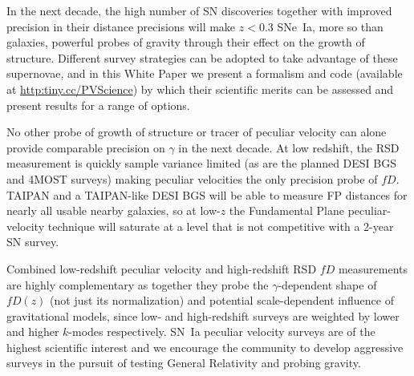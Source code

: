 \documentclass[11pt, oneside]{article}   	%
\begin{document}
In the next decade,
the high number of SN discoveries together with improved precision in their distance precisions will make $z<0.3$ SNe~Ia, more so than
galaxies,  powerful probes of gravity through their effect  on the growth of structure.  Different survey strategies can be adopted to take advantage of these
supernovae, and in this White Paper we present a formalism and code (available
at \url{http:tiny.cc/PVScience})
by which their scientific merits can be assessed and present results for a range of options.

No other probe of growth of structure or tracer of peculiar velocity can alone provide comparable precision on  $\gamma$ in the next decade.
At low redshift, the RSD measurement is quickly sample variance limited (as are the planned DESI BGS and 4MOST surveys) making peculiar velocities the only 
precision probe of $fD$.
TAIPAN and a TAIPAN-like DESI BGS will be able to measure FP distances for nearly all usable nearby galaxies, so at low-$z$ the Fundamental Plane peculiar-velocity
technique will  saturate at a level that is not competitive with a  2-year SN survey.

Combined low-redshift peculiar velocity and high-redshift RSD $fD$ measurements are highly complementary as together they probe the
$\gamma$-dependent shape of $fD(z)$ (not just its normalization) and potential scale-dependent influence of gravitational models, since low-
and high-redshift surveys are weighted by lower and higher $k$-modes respectively.
SN~Ia peculiar velocity surveys are of the highest scientific
interest and we encourage
the community to develop aggressive surveys in the pursuit of testing  General Relativity and probing gravity. 





\end{document}
